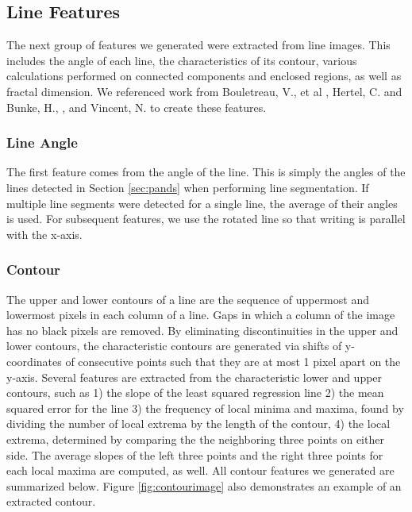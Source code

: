 \documentclass[paper=a4, fontsize=11pt]{scrartcl} %
\numberwithin{equation}{section} %
\numberwithin{figure}{section} %
\numberwithin{table}{section} %
\begin{document}
\subsection{Line Features}
The next group of features we generated were extracted from line
images. This includes the angle of each line, the characteristics of
its contour, various calculations performed on connected components
and enclosed regions, as well as fractal dimension. We referenced work
from Bouletreau, V., et al \cite{SyntheticParameters}, Hertel, C. and
Bunke, H., \cite{NovelFeatures}, and Vincent,
N. \cite{FractalDimensions} to create these features.

\subsubsection{Line Angle}
The first feature comes from the angle of the line. This is simply the
angles of the lines detected in Section \ref{sec:pands} when
performing line segmentation. If multiple line segments were detected
for a single line, the average of their angles is used. For subsequent
features, we use the rotated line so that writing is parallel with the
x-axis.

\subsubsection{Contour}
The upper and lower contours of a line are the sequence of uppermost and lowermost pixels in each column of a line. Gaps in which a column of the image has no black pixels are removed. By eliminating discontinuities in the upper and lower contours, the characteristic contours are generated via shifts of y-coordinates of consecutive points such that they are at most 1 pixel apart on the y-axis. Several features are extracted from the characteristic lower and upper contours, such as 1) the slope of the least squared regression line 2) the mean squared error for the line 3) the frequency of local minima and maxima, found by dividing the number of local extrema by the length of the contour, 4) the local extrema, determined by comparing the the neighboring three points on either side. The average slopes of the left three points and the right three points for each local maxima are computed, as well.  All contour features we generated are summarized below. Figure
\ref{fig:contourimage} also demonstrates an example of an extracted
contour.
\end{document}
